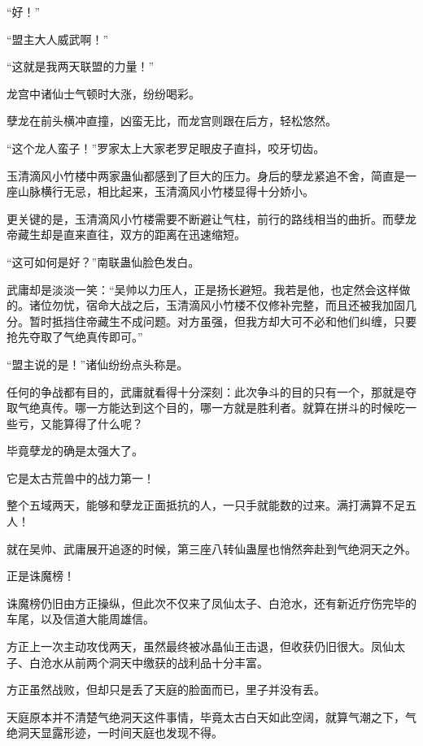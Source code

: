 
\begin{this_body}



“好！”

“盟主大人威武啊！”

“这就是我两天联盟的力量！”

龙宫中诸仙士气顿时大涨，纷纷喝彩。

孽龙在前头横冲直撞，凶蛮无比，而龙宫则跟在后方，轻松悠然。

“这个龙人蛮子！”罗家太上大家老罗足眼皮子直抖，咬牙切齿。

玉清滴风小竹楼中两家蛊仙都感到了巨大的压力。身后的孽龙紧追不舍，简直是一座山脉横行无忌，相比起来，玉清滴风小竹楼显得十分娇小。

更关键的是，玉清滴风小竹楼需要不断避让气柱，前行的路线相当的曲折。而孽龙帝藏生却是直来直往，双方的距离在迅速缩短。

“这可如何是好？”南联蛊仙脸色发白。

武庸却是淡淡一笑：“吴帅以力压人，正是扬长避短。我若是他，也定然会这样做的。诸位勿忧，宿命大战之后，玉清滴风小竹楼不仅修补完整，而且还被我加固几分。暂时抵挡住帝藏生不成问题。对方虽强，但我方却大可不必和他们纠缠，只要抢先夺取了气绝真传即可。”

“盟主说的是！”诸仙纷纷点头称是。

任何的争战都有目的，武庸就看得十分深刻：此次争斗的目的只有一个，那就是夺取气绝真传。哪一方能达到这个目的，哪一方就是胜利者。就算在拼斗的时候吃一些亏，又能算得了什么呢？

毕竟孽龙的确是太强大了。

它是太古荒兽中的战力第一！

整个五域两天，能够和孽龙正面抵抗的人，一只手就能数的过来。满打满算不足五人！

就在吴帅、武庸展开追逐的时候，第三座八转仙蛊屋也悄然奔赴到气绝洞天之外。

正是诛魔榜！

诛魔榜仍旧由方正操纵，但此次不仅来了凤仙太子、白沧水，还有新近疗伤完毕的车尾，以及信道大能周雄信。

方正上一次主动攻伐两天，虽然最终被冰晶仙王击退，但收获仍旧很大。凤仙太子、白沧水从前两个洞天中缴获的战利品十分丰富。

方正虽然战败，但却只是丢了天庭的脸面而已，里子并没有丢。

天庭原本并不清楚气绝洞天这件事情，毕竟太古白天如此空阔，就算气潮之下，气绝洞天显露形迹，一时间天庭也发现不得。


\end{this_body}
